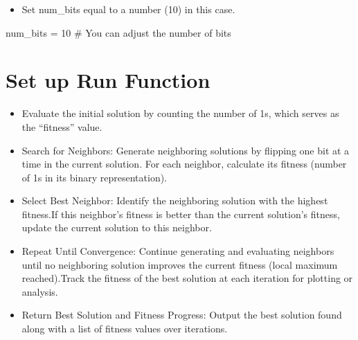 \documentclass[
  letterpaper,
  DIV=11,
  numbers=noendperiod]{scrreprt}
\newenvironment{Shaded}{\begin{snugshade}}{\end{snugshade}}
\newcommand{\CommentTok}[1]{\textcolor[rgb]{0.37,0.37,0.37}{#1}}
\newcommand{\DecValTok}[1]{\textcolor[rgb]{0.68,0.00,0.00}{#1}}
\newcommand{\NormalTok}[1]{\textcolor[rgb]{0.00,0.23,0.31}{#1}}
\newcommand{\OperatorTok}[1]{\textcolor[rgb]{0.37,0.37,0.37}{#1}}
\providecommand{\tightlist}{%
  \setlength{\itemsep}{0pt}\setlength{\parskip}{0pt}}\usepackage{longtable,booktabs,array}
\begin{document}
\begin{itemize}
\tightlist
\item
  Set num\_bits equal to a number (10) in this case.
\end{itemize}

\begin{Shaded}
\begin{Highlighting}[]
\NormalTok{num\_bits }\OperatorTok{=} \DecValTok{10}  \CommentTok{\# You can adjust the number of bits}
\end{Highlighting}
\end{Shaded}

\section{Set up Run Function}\label{set-up-run-function}

\begin{itemize}
\tightlist
\item
  Evaluate the initial solution by counting the number of 1s, which
  serves as the ``fitness'' value.
\item
  Search for Neighbors: Generate neighboring solutions by flipping one
  bit at a time in the current solution. For each neighbor, calculate
  its fitness (number of 1s in its binary representation).
\item
  Select Best Neighbor: Identify the neighboring solution with the
  highest fitness.If this neighbor's fitness is better than the current
  solution's fitness, update the current solution to this neighbor.
\item
  Repeat Until Convergence: Continue generating and evaluating neighbors
  until no neighboring solution improves the current fitness (local
  maximum reached).Track the fitness of the best solution at each
  iteration for plotting or analysis.
\item
  Return Best Solution and Fitness Progress: Output the best solution
  found along with a list of fitness values over iterations.
\end{itemize}
\end{document}
